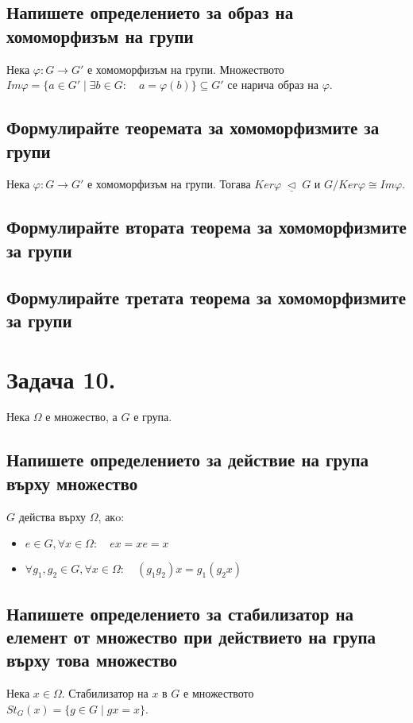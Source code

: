 \documentclass[10pt]{article}
\newcommand{\triq}{\; \underline{\triangleleft} \;}
\begin{document}
\subsection*{Напишете определението за образ на хомоморфизъм на групи}
Нека $\varphi: G \to G'$ е хомоморфизъм на групи. Множеството $Im\varphi = \{a \in G' \mid \exists b \in G: \quad a = \varphi(b)\} \subseteq G'$ се нарича образ на $\varphi$.

\subsection*{Формулирайте теоремата за хомоморфизмите за групи}
Нека $\varphi: G \to G'$ е хомоморфизъм на групи. Тогава $Ker\varphi \triq G$ и $G/Ker\varphi \cong Im\varphi$.

\subsection*{Формулирайте втората теорема за хомоморфизмите за групи}
\subsection*{Формулирайте третата теорема за хомоморфизмите за групи}

\section*{Задача 10.}
Нека $\Omega$ е множество, а $G$ е група.

\subsection*{Напишете определението за действие на група върху множество}
$G$ действа върху $\Omega$, акo:
\begin{itemize}
	\item $ e \in G, \forall x \in \Omega: \quad ex = xe = x$
	\item $\forall g_1, g_2 \in G, \forall x \in \Omega: \quad (g_1g_2)x = g_1(g_2x)$
\end{itemize}

\subsection*{Напишете определението за стабилизатор на елемент от множество при действието на група върху това множество}
Нека $x \in \Omega$. Стабилизатор на $x$ в $G$ е множеството\\ $St_G(x) = \{g \in G \mid gx = x\}$.
\end{document}
